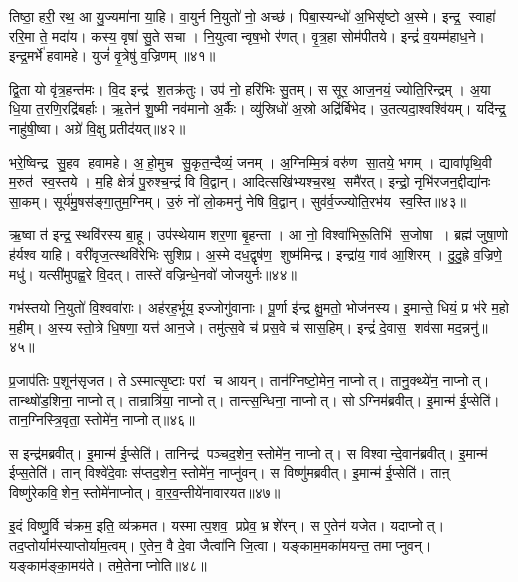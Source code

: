 तिष्ठा॒ हरी॒ रथ॒ आ यु॒ज्यमा॑ना या॒हि।
वा॒युर्न नि॒युतो॑ नो॒ अच्छ॑।
पिबा॒स्यन्धो॑ अ॒भिसृ॑ष्टो अ॒स्मे।
इन्द्र॒ स्वाहा॑ ररि॒मा ते॒ मदा॑य।
कस्य॒ वृषा॑ सु॒ते सचा।
नि॒युत्वान्वृष॒भो र॑णत्।
वृ॒त्र॒हा सोम॑पीतये।
इन्द्रं॑ व॒यम्म॑हाध॒ने।
इन्द्र॒मर्भे॑ हवामहे।
युजं॑ वृ॒त्रेषु॑ व॒ज्रिणम्॥४१॥

द्वि॒ता यो वृ॑त्र॒हन्त॑मः।
वि॒द इन्द्र॑ श॒तक्र॑तुः।
उप॑ नो॒ हरि॑भिः सु॒तम्।
स सूर॒ आज॒नयं॒ ज्योति॒रिन्द्रम्।
अ॒या धि॒या त॒रणि॒रद्रि॑बर्\mbox{}हाः।
ऋ॒तेन॑ शु॒ष्मी नव॑मानो अ॒र्कैः।
व्यु॑स्रिधो॑ अ॒स्रो अद्रि॑र्बिभेद।
उ॒तत्यदा॒श्वश्वि॑यम्।
यदि॑न्द्र॒ नाहु॑षी॒ष्वा।
अग्रे॑ वि॒क्षु प्रतीद॑यत्॥४२॥

भरे॒ष्विन्द्र सु॒हव हवामहे।
अ॒हो॒मुच सु॒कृत॒न्दैव्यं॒ जनम्।
अ॒ग्निम्मि॒त्रं वरु॑ण सा॒तये॒ भगम्।
द्यावा॑पृथि॒वी म॒रुत॑ स्व॒स्तये।
म॒हि क्षेत्रं॑ पु॒रुश्च॒न्द्रं वि वि॒द्वान्।
आदित्सखि॑भ्यश्च॒रथ॒ समै॑रत्।
इन्द्रो॒ नृभि॑रजन॒द्दीद्या॑नः सा॒कम्।
सूर्य॑मु॒षस॑ङ्गा॒तुम॒ग्निम्।
उ॒रुं नो॑ लो॒कमनु॑ नेषि वि॒द्वान्।
सुव॑र्व॒ज्ज्योति॒रभ॑य स्व॒स्ति॥४३॥

ऋ॒ष्वा त॑ इन्द्र॒ स्थवि॑रस्य बा॒हू।
उप॑स्थेयाम शर॒णा बृ॒हन्ता।
आ नो॒ विश्वा॑भिरू॒तिभि॑ स॒जोषा।
ब्रह्म॑ जुषा॒णो ह॑र्यश्व याहि।
वरी॑वृज॒त्स्थवि॑रेभिः सुशिप्र।
अ॒स्मे दध॒द्वृष॑ण॒ शुष्म॑मिन्द्र।
इन्द्रा॑य॒ गाव॑ आ॒शिरम्।
दु॒दु॒ह्रे व॒ज्रिणे॒ मधु॑।
यत्सी॑मुपह्व॒रे वि॒दत्।
तास्ते॑ वज्रिन्धे॒नवो॑ जोजयुर्नः॥४४॥

गभ॑स्तयो नि॒युतो॑ वि॒श्ववा॑राः।
अह॑रह॒र्भूय॒ इज्जोगु॑वानाः।
पू॒र्णा इ॑न्द्र क्षु॒मतो॒ भोज॑नस्य।
इ॒मान्ते॒ धियं॒ प्र भ॑रे म॒हो म॒हीम्।
अ॒स्य स्तो॒त्रे धि॒षणा॒ यत्त॑ आन॒जे।
तमु॑त्स॒वे च॑ प्रस॒वे च॑ सास॒हिम्।
इन्द्रं॑ दे॒वास॒ शव॑सा मद॒न्ननु॑॥४५॥\anuvakamend[व॒ज्रिण॑मयत्स्व॒स्ति जो॑जयुर्नः स॒प्त च॑]

प्र॒जाप॑तिः प॒शून॑सृजत।
तेऽस्मात्सृ॒ष्टाः परां च आयन्।
तान॑ग्निष्टो॒मेन॒ नाप्नोत्।
तानु॒क्थ्ये॑न॒ नाप्नोत्।
तान्थ्षो॑ड॒शिना॒ नाप्नोत्।
तान्रात्रि॑या॒ नाप्नोत्।
तान्त्स॒न्धिना॒ नाप्नोत्।
सोऽग्निम॑ब्रवीत्।
इ॒मान्म॑ ई॒प्सेति॑।
तान॒ग्निस्त्रि॒वृता॒ स्तोमे॑न॒ नाप्नोत्॥४६॥

स इन्द्र॑मब्रवीत्।
इ॒मान्म॑ ई॒प्सेति॑।
तानिन्द्र॑ पञ्चद॒शेन॒ स्तोमे॑न॒ नाप्नोत्।
स विश्वान्दे॒वान॑ब्रवीत्।
इ॒मान्म॑ ईप्स॒तेति॑।
तान् विश्वे॑दे॒वाः स॑प्तद॒शेन॒ स्तोमे॑न॒ नाप्नु॑वन्।
स विष्णु॑मब्रवीत्।
इ॒मान्म॑ ई॒प्सेति॑।
ताऩ् विष्णु॑रेकवि॒शेन॒ स्तोमे॑नाप्नोत्।
वा॒र॒व॒न्तीये॑नावारयत॥४७॥

इ॒दं विष्णु॒र्वि च॑क्रम॒ इति॒ व्य॑क्रमत।
यस्मात्प॒शव॒ प्रप्रेव॒ भ्रशे॑रन्।
स ए॒तेन॑ यजेत।
यदाप्नोत्।
तद॒प्तोर्याम॑स्याप्तोर्याम॒त्वम्।
ए॒तेन॒ वै दे॒वा जैत्वा॑नि जि॒त्वा।
यङ्काम॒मका॑मयन्त॒ तमाप्नुवन्।
यङ्काम॑ङ्का॒मय॑ते।
तमे॒तेनाप्नोति॥४८॥\anuvakamend[स्तोमे॑न॒ नाप्नो॑दवारयत॒ नव॑ च]

